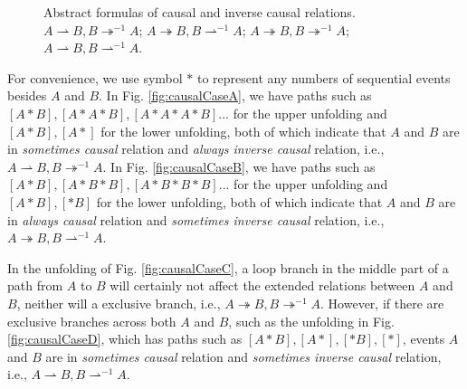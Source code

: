 \documentclass{llncs}
\begin{document}
\begin{figure}[htbp]
{\begin{minipage}[b]{0.45\textwidth}
	\end{minipage}
	\label{fig:causalCaseC}
}
\caption{Abstract formulas of causal and inverse causal relations.  $A\rightharpoonup B, B\twoheadrightarrow^{-1}A$;  $A\twoheadrightarrow B, B\rightharpoonup^{-1}A$;  $A\twoheadrightarrow B, B\twoheadrightarrow^{-1}A$;  $A\rightharpoonup B, B\rightharpoonup^{-1}A$.}
\label{fig:causalCases}
\end{figure}

For convenience, we use symbol $*$ to represent any numbers of sequential events besides $A$ and $B$. In Fig. \ref{fig:causalCaseA}, we have paths such as $[A*B],[A*A*B],[A*A*A*B]...$ for the upper unfolding and $[A*B],[A*]$ for the lower unfolding, both of which indicate that $A$ and $B$ are in \textit{sometimes causal} relation and \textit{always inverse causal} relation, i.e., $A\rightharpoonup B,B\twoheadrightarrow^{-1}A$. In Fig. \ref{fig:causalCaseB}, we have paths such as $[A*B],[A*B*B],[A*B*B*B]...$ for the upper unfolding and $[A*B],[*B]$ for the lower unfolding, both of which indicate that $A$ and $B$ are in \textit{always causal} relation and \textit{sometimes inverse causal} relation, i.e., $A\twoheadrightarrow B,B\rightharpoonup^{-1}A$.

In the unfolding of Fig. \ref{fig:causalCaseC}, a loop branch in the middle part of a path from $A$ to $B$ will certainly not affect the extended relations between $A$ and $B$, neither will a exclusive branch, i.e., $A\twoheadrightarrow B,B\twoheadrightarrow^{-1}A$. However, if there are exclusive branches across both $A$ and $B$, such as the unfolding in Fig. \ref{fig:causalCaseD}, which has paths such as $[A*B],[A*],[*B],[*]$, events $A$ and $B$ are in \textit{sometimes causal} relation and \textit{sometimes inverse causal} relation, i.e., $A\rightharpoonup B,B\rightharpoonup^{-1}A$.
\end{document}
